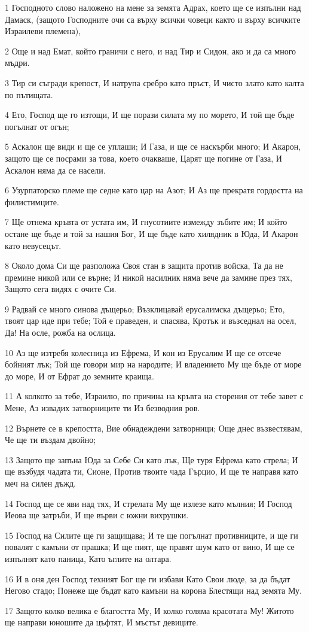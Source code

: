 \par 1 Господното слово наложено на мене за земята Адрах, което ще се изпълни над Дамаск, (защото Господните очи са върху всички човеци както и върху всичките Израилеви племена),
\par 2 Още и над Емат, който граничи с него, и над Тир и Сидон, ако и да са много мъдри.
\par 3 Тир си съгради крепост, И натрупа сребро като пръст, И чисто злато като калта по пътищата.
\par 4 Ето, Господ ще го изтощи, И ще порази силата му по морето, И той ще бъде погълнат от огън;
\par 5 Аскалон ще види и ще се уплаши; И Газа, и ще се наскърби много; И Акарон, защото ще се посрами за това, което очакваше, Царят ще погине от Газа, И Аскалон няма да се насели.
\par 6 Узурпаторско племе ще седне като цар на Азот; И Аз ще прекратя гордостта на филистимците.
\par 7 Ще отнема кръвта от устата им, И гнусотиите измежду зъбите им; И който остане ще бъде и той за нашия Бог, И ще бъде като хилядник в Юда, И Акарон като невусецът.
\par 8 Около дома Си ще разположа Своя стан в защита против войска, Та да не премине никой или се върне; И никой насилник няма вече да замине през тях, Защото сега видях с очите Си.
\par 9 Радвай се много синова дъщерьо; Възклицавай ерусалимска дъщерьо; Ето, твоят цар иде при тебе; Той е праведен, и спасява, Кротък и възседнал на осел, Да! На осле, рожба на ослица.
\par 10 Аз ще изтребя колесница из Ефрема, И кон из Ерусалим И ще се отсече бойният лък; Той ще говори мир на народите; И владението Му ще бъде от море до море, И от Ефрат до земните краища.
\par 11 А колкото за тебе, Израилю, по причина на кръвта на сторения от тебе завет с Мене, Аз извадих затворниците ти Из безводния ров.
\par 12 Върнете се в крепостта, Вие обнадеждени затворници; Още днес възвестявам, Че ще ти въздам двойно;
\par 13 Защото ще запъна Юда за Себе Си като лък, Ще туря Ефрема като стрела; И ще възбудя чадата ти, Сионе, Против твоите чада Гърцио, И ще те направя като меч на силен дъжд.
\par 14 Господ ще се яви над тях, И стрелата Му ще излезе като мълния; И Господ Иеова ще затръби, И ще върви с южни вихрушки.
\par 15 Господ на Силите ще ги защищава; И те ще погълнат противниците, и ще ги повалят с камъни от прашка; И ще пият, ще правят шум като от вино, И ще се изпълнят като паница, Като ъглите на олтара.
\par 16 И в оня ден Господ техният Бог ще ги избави Като Свои люде, за да бъдат Негово стадо; Понеже ще бъдат като камъни на корона Блестящи над земята Му.
\par 17 Защото колко велика е благостта Му, И колко голяма красотата Му! Житото ще направи юношите да цъфтят, И мъстът девиците.

